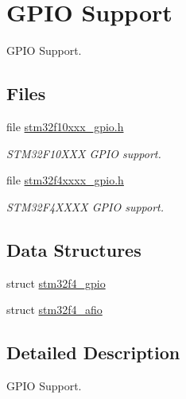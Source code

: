 \hypertarget{group__stm32f4__gpio}{}\section{G\+P\+IO Support}
\label{group__stm32f4__gpio}


G\+P\+IO Support.  


\subsection*{Files}
\begin{DoxyCompactItemize}
\item 
file \mbox{\hyperlink{stm32f10xxx__gpio_8h}{stm32f10xxx\+\_\+gpio.\+h}}
\begin{DoxyCompactList}\small\item\em S\+T\+M32\+F10\+X\+XX G\+P\+IO support. \end{DoxyCompactList}\item 
file \mbox{\hyperlink{stm32f4xxxx__gpio_8h}{stm32f4xxxx\+\_\+gpio.\+h}}
\begin{DoxyCompactList}\small\item\em S\+T\+M32\+F4\+X\+X\+XX G\+P\+IO support. \end{DoxyCompactList}\end{DoxyCompactItemize}
\subsection*{Data Structures}
\begin{DoxyCompactItemize}
\item 
struct \mbox{\hyperlink{structstm32f4__gpio}{stm32f4\+\_\+gpio}}
\item 
struct \mbox{\hyperlink{structstm32f4__afio}{stm32f4\+\_\+afio}}
\end{DoxyCompactItemize}


\subsection{Detailed Description}
G\+P\+IO Support. 

